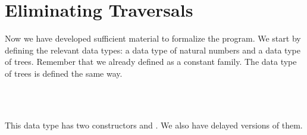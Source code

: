 \section{Eliminating Traversals}
Now we have developed sufficient material to formalize the program.
We start by defining the relevant data types: a data type of natural numbers and a data type of trees.
Remember that we already defined  as a constant family.
The data type of trees is defined the same way.

\begin{code}%
\>[0]\AgdaSpace{}%
\AgdaSpace{}%
\AgdaSymbol{:}\AgdaSpace{}%
\AgdaSpace{}%
\<%
\\
\>[0][@{}l@{\AgdaIndent{0}}]%
\>[2]\AgdaSpace{}%
\AgdaSymbol{:}\AgdaSpace{}%
\AgdaSpace{}%
\AgdaSpace{}%
\<%
\\
%
\>[2]\AgdaSpace{}%
\AgdaSymbol{:}\AgdaSpace{}%
\AgdaSpace{}%
\AgdaSpace{}%
\AgdaSpace{}%
\AgdaSpace{}%
\<%
\end{code}

This data type has two constructors  and .
We also have delayed versions of them.

\begin{code}%
\>[0]\AgdaSpace{}%
\AgdaSymbol{:}\AgdaSpace{}%
\AgdaSymbol{(}\AgdaSymbol{(}\AgdaSpace{}%
\AgdaSymbol{)}\AgdaSpace{}%
\AgdaSpace{}%
\AgdaSpace{}%
\AgdaSymbol{(}\AgdaSpace{}%
\AgdaSymbol{))}\<%
\\
\>[0]\AgdaSpace{}%
\AgdaSpace{}%
\AgdaSymbol{=}\AgdaSpace{}%
\AgdaSpace{}%
\AgdaSpace{}%
\AgdaSpace{}%
\<%
\\
%
\\[\AgdaEmptyExtraSkip]%
\>[0]\AgdaSpace{}%
\AgdaSymbol{:}\AgdaSpace{}%
\AgdaSymbol{(}\AgdaSymbol{(}\AgdaSpace{}%
\AgdaSymbol{)}\AgdaSpace{}%
\AgdaSpace{}%
\AgdaSymbol{(}\AgdaSpace{}%
\AgdaSymbol{)}\AgdaSpace{}%
\AgdaSpace{}%
\AgdaSymbol{(}\AgdaSpace{}%
\AgdaSymbol{))}\<%
\\
\>[0]\AgdaSpace{}%
\AgdaSpace{}%
\AgdaSpace{}%
\AgdaSymbol{=}\AgdaSpace{}%
\AgdaSpace{}%
\AgdaSpace{}%
\AgdaSpace{}%
\AgdaSpace{}%
\AgdaSpace{}%
\<%
\end{code}

